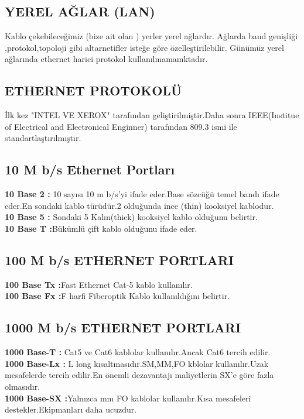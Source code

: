 \subsection*{YEREL AĞLAR (LAN)}
Kablo çekebileceğimiz (bize ait  olan ) yerler yerel ağlardır.
Ağlarda band genişliği ,protokol,topoloji gibi altarnetifler isteğe göre özelleştirilebilir.
Günümüz yerel ağlarında ethernet harici protokol kullanılmamamktadır.
\subsection*{ETHERNET PROTOKOLÜ}
İlk kez "INTEL VE XEROX" tarafından geliştirilmiştir.Daha sonra IEEE(Institue of Electrical and Electronical Enginner) tarafından 809.3 ismi ile standartlaştırılmıştır.
\subsection*{10 M b/s Ethernet Portları}
\textbf{10 Base 2 :} 10 sayısı 10 m b/s'yi ifade eder.Base sözcüğü temel bandı ifade eder.En sondaki kablo türüdür.2 olduğunda ince (thin) kooksiyel kablodur.\\
\textbf{10 Base 5 :} Sondaki 5 Kalın(thick) kooksiyel kablo olduğunu belirtir.\\
\textbf{10  Base T :}Bükümlü çift kablo olduğunu ifade eder.\\
\subsection*{100 M b/s ETHERNET PORTLARI}
\textbf{100 Base Tx :}Fast Ethernet Cat-5 kablo kullanılır.\\
\textbf{100 Base Fx :}F harfi Fiberoptik Kablo kullanıldığını belirtir.\\
\subsection*{1000 M b/s ETHERNET PORTLARI}
\textbf{1000 Base-T :} Cat5 ve Cat6 kablolar kullanılır.Ancak Cat6 tercih edilir.\\
\textbf{1000 Base-Lx :} L long kısaltmasıdır.SM,MM,FO kblolar kullanılır.Uzak mesafelerde tercih edilir.En önemli dezavantajı maliyetlerin SX'e göre fazla olmasıdır.\\
\textbf{1000 Base-SX :}Yalnızca mm FO kablolar kullanılır.Kısa mesafeleri destekler.Ekipmanları daha ucuzdur.\\
